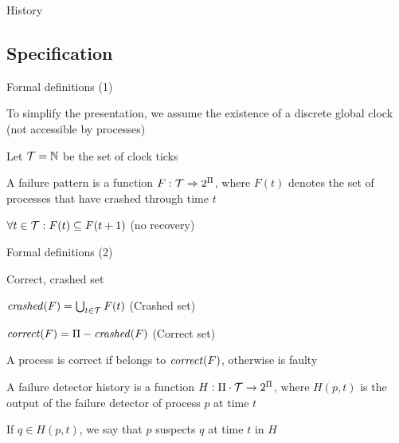 \begin{frame}{History}
	
\begin{Bib}
\BIL
\item {} 
\item {}
\item {}
\EIL
\end{Bib}
\end{frame}


\subsection{Specification}

\begin{frame}{Formal definitions (1)}

\begin{definition}[Time]
\BI
\item To simplify the presentation, we assume the existence of a discrete
global clock (not accessible by processes)
\item Let ${\cal T} = \mathbb{N}$ be the \alert{set of clock ticks}
\EI
\end{definition}

\begin{definition}
A \alert{failure pattern} is a function $F: {\cal T} \Rightarrow 2^\Pi$,
where $F(t)$ denotes the set of processes that have crashed through time $t$
\BI
\item $\forall t \in {\cal T}: F(t) \subseteq F(t+1)$ (no recovery)
\EI
\end{definition}

\end{frame}

\begin{frame}{Formal definitions (2)}

\begin{definition}{Correct, crashed set}
\BI
\item $\mathit{crashed}(F) = \bigcup_{t \in {\cal T}} F(t)$ (\alert{Crashed set})
\item $\mathit{correct}(F) = \Pi - \mathit{crashed}(F)$ (\alert{Correct set}) 
\item A process is \alert{correct} if belongs to $\mathit{correct}(F)$, otherwise is \alert{faulty}
\EI
\end{definition}


\begin{definition}
A \alert{failure detector history} is a function $H: \Pi \cdot {\cal T} \rightarrow 2^\Pi$,
where $H(p,t)$ is the output of the failure detector of process $p$ at time $t$
\BI
\item If $q \in H(p, t)$, we say that $p$ \alert{suspects} $q$ at time $t$ in $H$
\EI
\end{definition}	
	
\end{frame}


